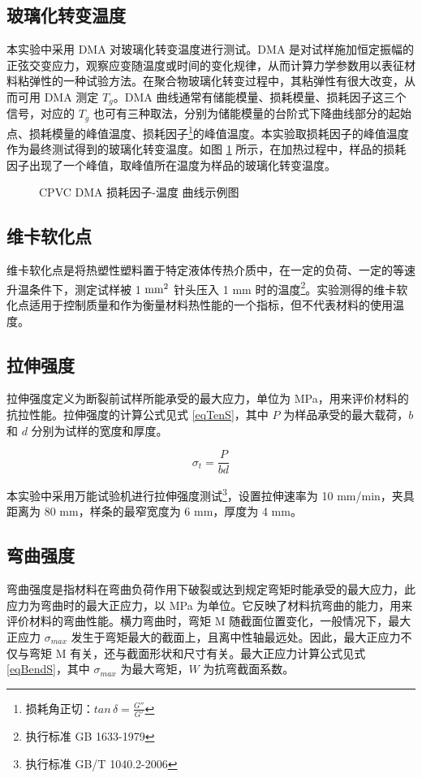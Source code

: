 \subsection{玻璃化转变温度}
本实验中采用 DMA 对玻璃化转变温度进行测试。DMA 是对试样施加恒定振幅的正弦交变应力，观察应变随温度或时间的变化规律，从而计算力学参数用以表征材料粘弹性的一种试验方法。在聚合物玻璃化转变过程中，其粘弹性有很大改变，从而可用 DMA 测定 $T_g$。DMA 曲线通常有储能模量、损耗模量、损耗因子这三个信号，对应的 $T_g$ 也可有三种取法，分别为储能模量的台阶式下降曲线部分的起始点、损耗模量的峰值温度、损耗因子\footnote{损耗角正切：$tan \, \delta = \frac{G''}{G'}$}的峰值温度。本实验取损耗因子的峰值温度作为最终测试得到的玻璃化转变温度。如图 \ref{figExTg} 所示，在加热过程中，样品的损耗因子出现了一个峰值，取峰值所在温度为样品的玻璃化转变温度。

\begin{figure}[!htbp]
    \begin{center}
        
    \end{center}
    \caption{CPVC DMA 损耗因子-温度 曲线示例图}
    \label{figExTg}
\end{figure}

\subsection{维卡软化点}
维卡软化点是将热塑性塑料置于特定液体传热介质中，在一定的负荷、一定的等速升温条件下，测定试样被 1 $\rm{mm^2}$ 针头压入 1 mm 时的温度\footnote{执行标准 GB 1633-1979}。实验测得的维卡软化点适用于控制质量和作为衡量材料热性能的一个指标，但不代表材料的使用温度。

\subsection{拉伸强度}
拉伸强度定义为断裂前试样所能承受的最大应力，单位为 MPa，用来评价材料的抗拉性能。拉伸强度的计算公式见式 \eqref{eqTenS}，其中 $P$ 为样品承受的最大载荷，$b$ 和 $d$ 分别为试样的宽度和厚度。

\begin{equation}
    \label{eqTenS}
    \sigma_t = \frac{P}{bd}
\end{equation}

本实验中采用万能试验机进行拉伸强度测试\footnote{执行标准 GB/T 1040.2-2006}，设置拉伸速率为 10 mm/min，夹具距离为 80 mm，样条的最窄宽度为 6 mm，厚度为 4 mm。

\subsection{弯曲强度}
弯曲强度是指材料在弯曲负荷作用下破裂或达到规定弯矩时能承受的最大应力，此应力为弯曲时的最大正应力，以 MPa 为单位。它反映了材料抗弯曲的能力，用来评价材料的弯曲性能。横力弯曲时，弯矩 M 随截面位置变化，一般情况下，最大正应力 $\sigma_{max}$ 发生于弯矩最大的截面上，且离中性轴最远处。因此，最大正应力不仅与弯矩 M 有关，还与截面形状和尺寸有关。最大正应力计算公式见式 \eqref{eqBendS}，其中 $\sigma_{max}$ 为最大弯矩，$W$ 为抗弯截面系数。

